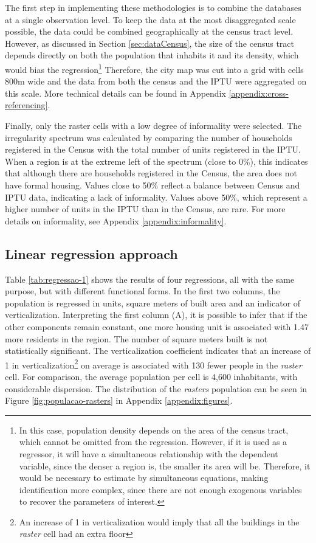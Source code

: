 The first step in implementing these methodologies is to combine the databases at a single observation level. To keep the data at the most disaggregated scale possible, the data could be combined geographically at the census tract level. However, as discussed in Section \ref{sec:dataCensus}, the size of the census tract depends directly on both the population that inhabits it and its density, which would bias the regression\footnote{In this case, population density depends on the area of the census tract, which cannot be omitted from the regression. However, if it is used as a regressor, it will have a simultaneous relationship with the dependent variable, since the denser a region is, the smaller its area will be. Therefore, it would be necessary to estimate by simultaneous equations, making identification more complex, since there are not enough exogenous variables to recover the parameters of interest.} Therefore, the city map was cut into a grid with cells 800m wide and the data from both the census and the IPTU were aggregated on this scale. More technical details can be found in Appendix \ref{appendix:cross-referencing}.

Finally, only the raster cells with a low degree of informality were selected. The irregularity spectrum was calculated by comparing the number of households registered in the Census with the total number of units registered in the IPTU. When a region is at the extreme left of the spectrum (close to 0\%), this indicates that although there are households registered in the Census, the area does not have formal housing. Values close to 50\% reflect a balance between Census and IPTU data, indicating a lack of informality. Values above 50\%, which represent a higher number of units in the IPTU than in the Census, are rare. For more details on informality, see Appendix \ref{appendix:informality}.

\subsection{Linear regression approach}
\label{subsec:reglin}

{\tiny

}

Table \ref{tab:regressao-1} shows the results of four regressions, all with the same purpose, but with different functional forms. In the first two columns, the population is regressed in units, square meters of built area and an indicator of verticalization. Interpreting the first column (A), it is possible to infer that if the other components remain constant, one more housing unit is associated with 1.47 more residents in the region. The number of square meters built is not statistically significant. The verticalization coefficient indicates that an increase of 1 in verticalization\footnote{An increase of 1 in verticalization would imply that all the buildings in the \textit{raster} cell had an extra floor} on average is associated with 130 fewer people in the \textit{raster} cell. For comparison, the average population per cell is 4,600 inhabitants, with considerable dispersion. The distribution of the \textit{rasters} population can be seen in Figure \ref{fig:populacao-rasters} in Appendix \ref{appendix:figures}.

